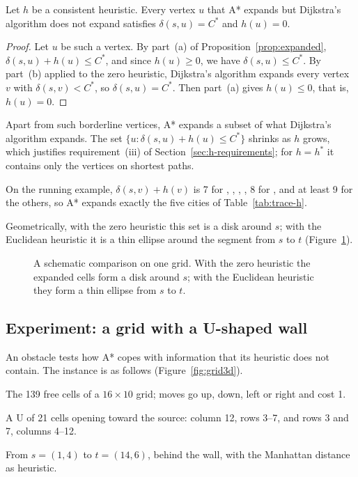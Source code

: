 \begin{corollary}\label{cor:subset}
Let $h$ be a consistent heuristic. Every vertex $u$ that A* expands but
Dijkstra's algorithm does not expand satisfies $\delta(s,u) = C^{*}$ and
$h(u) = 0$.
\end{corollary}

\begin{proof}
Let $u$ be such a vertex. By part~(a) of Proposition~\ref{prop:expanded},
$\delta(s,u) + h(u) \le C^{*}$, and since $h(u) \ge 0$, we have
$\delta(s,u) \le C^{*}$. By part~(b) applied to the zero heuristic, Dijkstra's
algorithm expands every vertex $v$ with $\delta(s,v) < C^{*}$, so
$\delta(s,u) = C^{*}$. Then part~(a) gives $h(u) \le 0$, that is, $h(u) = 0$.
\end{proof}

Apart from such borderline vertices, A* expands a subset of what Dijkstra's
algorithm expands. The set $\{u : \delta(s,u) + h(u) \le C^{*}\}$ shrinks as $h$
grows, which justifies requirement~(iii) of Section~\ref{sec:h-requirements};
for $h = h^{*}$ it contains only the vertices on shortest paths.

On the running example, $\delta(s,v) + h(v)$ is 7 for , ,
, , 8 for , and at least 9 for the others, so A* expands
exactly the five cities of Table~\ref{tab:trace-h}.

Geometrically, with the zero heuristic this set is a disk around $s$; with the
Euclidean heuristic it is a thin ellipse around the segment from $s$ to $t$
(Figure~\ref{fig:funnel}).

\begin{figure}[htbp]
  \centering
  
  \caption{A schematic comparison on one grid. With the zero heuristic the
    expanded cells form a disk around $s$; with the Euclidean heuristic they
    form a thin ellipse from $s$ to $t$.}\label{fig:funnel}
\end{figure}

\subsection{Experiment: a grid with a U-shaped wall}\label{sec:grid}

An obstacle tests how A* copes with information that its heuristic does not
contain. The instance is as follows (Figure~\ref{fig:grid3d}).

\begin{description}[font=\normalfont\itshape, leftmargin=1.5em, labelindent=0pt]
    \item[Graph.] The 139 free cells of a $16 \times 10$ grid; moves go up, down,
    left or right and cost 1.
  \item[Wall.] A U of 21 cells opening toward the source: column 12, rows 3--7,
    and rows 3 and 7, columns 4--12.
  \item[Query.] From $s = (1,4)$ to $t = (14,6)$, behind the wall, with the
    Manhattan distance as heuristic.
\end{description}

